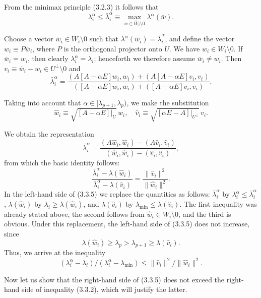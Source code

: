 \documentclass[11pt,oneside]{book}
\begin{document}
From the minimax principle (3.2.3) it follows that
\[
\lambda_i^\alpha \leqslant \bar{\lambda}_i^\alpha \equiv \max_{w \in \overline{W}_i \setminus 0} \lambda^\alpha(\bar{w}). %
\]

Choose a vector $\bar{w}_i \in \overline{W}_i \setminus 0$ such that $\lambda^\alpha(\bar{w}_i) = \bar{\lambda}_i^\alpha$, and define the vector $w_i \equiv P\bar{w}_i$, where $P$ is the orthogonal projector onto $U$. We have $w_i \in W_i \setminus 0$. If $\bar{w}_i = w_i$, then clearly $\lambda_i^\alpha = \lambda_i$; %
henceforth we therefore assume $\bar{w}_i \neq w_i$. Then $v_i \equiv \bar{w}_i - w_i \in U^\perp \setminus 0$ and
\[
\bar{\lambda}_i^\alpha = \frac{(A[A - \alpha E]w_i, w_i) + (A[A - \alpha E]v_i, v_i)}{([A - \alpha E]w_i, w_i) + ([A - \alpha E]v_i, v_i)}.
\]

Taking into account that $\alpha \in [\lambda_{p+1}, \lambda_p)$, we make the substitution
\[
\hat{w}_i \equiv \sqrt{[A - \alpha E]|_U}\, w_i, \quad \hat{v}_i \equiv \sqrt{[\alpha E - A]|_{U^\perp}}\, v_i.
\tag{3.3.3}
\]

We obtain the representation
\[
\bar{\lambda}_i^\alpha = \frac{(A\hat{w}_i, \hat{w}_i) - (A\hat{v}_i, \hat{v}_i)}{(\hat{w}_i, \hat{w}_i) - (\hat{v}_i, \hat{v}_i)},
\tag{3.3.4}
\]
from which the basic identity follows:
\[
\frac{\bar{\lambda}_i^\alpha - \lambda(\hat{w}_i)}{\bar{\lambda}_i^\alpha - \lambda(\hat{v}_i)} = \frac{\|\hat{v}_i\|^2}{\|\hat{w}_i\|^2}.
\tag{3.3.5}
\]
In the left-hand side of (3.3.5) we replace the quantities as follows: $\bar{\lambda}_i^\alpha$ by $\lambda_i^\alpha \leqslant \bar{\lambda}_i^\alpha$, $\lambda(\hat{w}_i)$ by $\lambda_i \geqslant \lambda(\hat{w}_i)$, and $\lambda(\hat{v}_i)$ by $\lambda_{\min} \leqslant \lambda(\hat{v}_i)$. The first inequality was already stated above, the second follows from $\hat{w}_i \in W_i \setminus 0$, and the third is obvious. Under this replacement, the left-hand side of (3.3.5) does not increase, since
\[
\lambda(\hat{w}_i) \geqslant \lambda_p > \lambda_{p+1} \geqslant \lambda(\hat{v}_i).
\]
Thus, we arrive at the inequality
\[
(\lambda_i^\alpha - \lambda_i) / (\lambda_i^\alpha - \lambda_{\min}) \leqslant \|\hat{v}_i\|^2 / \|\hat{w}_i\|^2.
\]

Now let us show that the right-hand side of (3.3.5) does not exceed the right-hand side of inequality (3.3.2), which will justify the latter.
\end{document}
